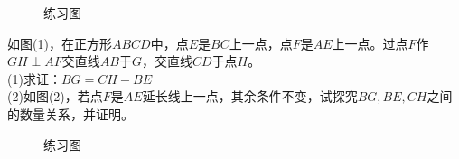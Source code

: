 \begin{figure}[H]
    \centering
    \resizebox{5cm}{!}{}
    \caption{练习图}
\end{figure}
\begin{problem}
如图(1)，在正方形$ABCD$中，点$E$是$BC$上一点，点$F$是$AE$上一点。过点$F$作$GH\perp AF$交直线$AB$于$G$，交直线$CD$于点$H$。 \\
(1)求证：$BG=CH-BE$ \\
(2)如图(2)，若点$F$是$AE$延长线上一点，其余条件不变，试探究$BG,BE,CH$之间的数量关系，并证明。\\
\end{problem}
\begin{figure}[H]
    \centering
    \resizebox{6cm}{!}{}
    \caption{练习图}
\end{figure}
\clearpage
